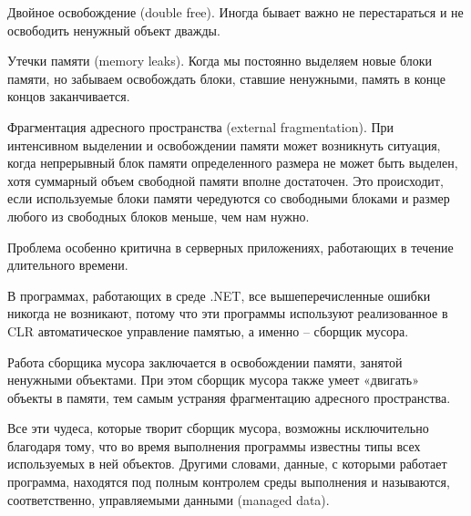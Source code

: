 Двойное освобождение (double free). Иногда бывает важно не перестараться и не освободить ненужный объект дважды.

Утечки памяти (memory leaks). Когда мы постоянно выделяем новые блоки памяти, но забываем освобождать блоки, ставшие ненужными, память в конце концов заканчивается.

Фрагментация адресного пространства (external fragmentation). При интенсивном выделении и освобождении памяти может возникнуть ситуация, когда непрерывный блок памяти определенного размера не может быть выделен, хотя суммарный объем свободной памяти вполне достаточен. Это происходит, если используемые блоки памяти чередуются со свободными блоками и размер любого из свободных блоков меньше, чем нам нужно.

Проблема особенно критична в серверных приложениях, работающих в течение длительного времени.

В программах, работающих в среде .NET, все вышеперечисленные ошибки никогда не возникают, потому что эти программы используют реализованное в CLR автоматическое управление памятью, а именно – сборщик мусора.

Работа сборщика мусора заключается в освобождении памяти, занятой ненужными объектами. При этом сборщик мусора также умеет «двигать» объекты в памяти, тем самым устраняя фрагментацию адресного пространства.

Все эти чудеса, которые творит сборщик мусора, возможны исключительно благодаря тому, что во время выполнения программы известны типы всех используемых в ней объектов. Другими словами, данные, с которыми работает программа, находятся под полным контролем среды выполнения и называются, соответственно, управляемыми данными (managed data).

